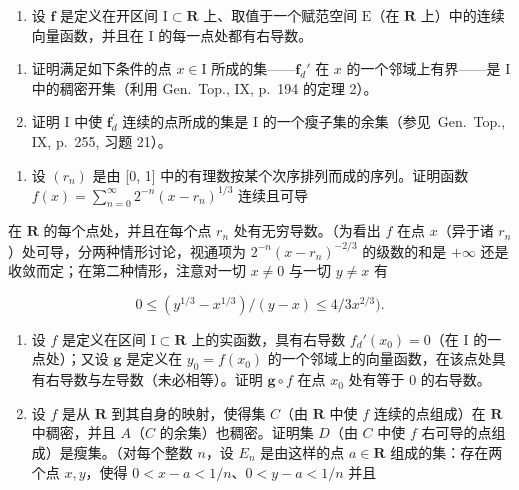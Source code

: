 \begin{enumerate}
\def\labelenumi{\arabic{enumi})}
\setcounter{enumi}{4}
\tightlist
\item
  设 \(\mathbf{f}\) 是定义在开区间 \(\mathrm{I} \subset \mathbf{R}\) 上、取值于一个赋范空间 \(\mathrm{E}\)（在 \(\mathbf{R}\) 上）中的连续向量函数，并且在 \(\mathrm{I}\) 的每一点处都有右导数。
\end{enumerate}

\begin{enumerate}
\def\labelenumi{\alph{enumi})}
\item
  证明满足如下条件的点 \(x \in \mathrm{I}\) 所成的集——\(\mathbf{f}_d'\) 在 \(x\) 的一个邻域上有界——是 \(\mathrm{I}\) 中的稠密开集（利用 Gen.~Top., IX, p.~194 的定理 2）。
\item
  证明 I 中使 \(\mathbf{f}_d^{\prime}\) 连续的点所成的集是 I 的一个瘦子集的余集（参见~Gen.~Top., IX, p.~255, 习题 21）。
\end{enumerate}

\begin{enumerate}
\def\labelenumi{\arabic{enumi})}
\setcounter{enumi}{5}
\tightlist
\item
  设 \((r_n)\) 是由 {[}0, 1{]} 中的有理数按某个次序排列而成的序列。证明函数 \(f(x) = \sum_{n=0}^{\infty} 2^{-n}(x - r_n)^{1/3}\) 连续且可导
\end{enumerate}

在 \(\mathbf{R}\) 的每个点处，并且在每个点 \(r_n\) 处有无穷导数。（为看出 \(f\) 在点 \(x\)（异于诸 \(r_n\)）处可导，分两种情形讨论，视通项为 \(2^{-n}(x - r_n)^{-2/3}\) 的级数的和是 \(+\infty\) 还是收敛而定；在第二种情形，注意对一切 \(x \neq 0\) 与一切 \(y \neq x\) 有

\[
0 \leqslant (y ^ {1 / 3} - x ^ {1 / 3}) / (y - x) \leqslant 4 / 3 x ^ {2 / 3}).
\]

\begin{enumerate}
\def\labelenumi{\arabic{enumi})}
\setcounter{enumi}{6}
\item
  设 \(f\) 是定义在区间 \(\mathrm{I} \subset \mathbf{R}\) 上的实函数，具有右导数 \(f_d'(x_0) = 0\)（在 \(\mathrm{I}\) 的一点处）；又设 \(\mathbf{g}\) 是定义在 \(y_0 = f(x_0)\) 的一个邻域上的向量函数，在该点处具有右导数与左导数（未必相等）。证明 \(\mathbf{g} \circ f\) 在点 \(x_0\) 处有等于 0 的右导数。
\item
  设 \(f\) 是从 \(\mathbf{R}\) 到其自身的映射，使得集 \(C\)（由 \(\mathbf{R}\) 中使 \(f\) 连续的点组成）在 \(\mathbf{R}\) 中稠密，并且 \(A\)（\(C\) 的余集）也稠密。证明集 \(D\)（由 \(C\) 中使 \(f\) 右可导的点组成）是瘦集。（对每个整数 \(n\)，设 \(E_n\) 是由这样的点 \(a \in \mathbf{R}\) 组成的集：存在两个点 \(x, y\)，使得 \(0 < x - a < 1/n\)、\(0 < y - a < 1/n\) 并且
\end{enumerate}

